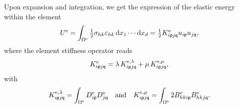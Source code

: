 Upon expansion and integration, we get the expression of the elastic energy
within the element
\begin{equation}
  U^{\mathrm{e}}
  =\int_{\Omega^{\mathrm{e}}}\tfrac12\sigma_{hk}\varepsilon_{hk}\,\mathrm d x_1\cdots\mathrm d x_d
  =\tfrac12K^{\mathrm{e}}_{i\mathsf{p}j\mathsf{q}}u_{i\mathsf{p}}u_{j\mathsf{q}},
\end{equation}
where the element stiffness operator reads
\begin{equation}
  K^{\mathrm{e}}_{i\mathsf{p}j\mathsf{q}}
  =\lambda\,K^{\mathrm{e}, \lambda}_{i\mathsf{p}j\mathsf{q}}
  +\mu\,K^{\mathrm{e}, \mu}_{i\mathsf{p}j\mathsf{q}},
\end{equation}
with
\begin{equation}
  K^{\mathrm{e}, \lambda}_{i\mathsf{p}j\mathsf{q}}
  =\int_{\Omega^{\mathrm{e}}}D^{\mathrm{e}}_{i\mathsf{p}}D^{\mathrm{e}}_{j\mathsf{q}}
  \quad\text{and}\quad
  K^{\mathrm{e}, \mu}_{i\mathsf{p}j\mathsf{q}}
  =\int_{\Omega^{\mathrm{e}}} 2 B^{\mathrm{e}}_{hki\mathsf{p}}B^{\mathrm{e}}_{hkj\mathsf{q}}.
\end{equation}
